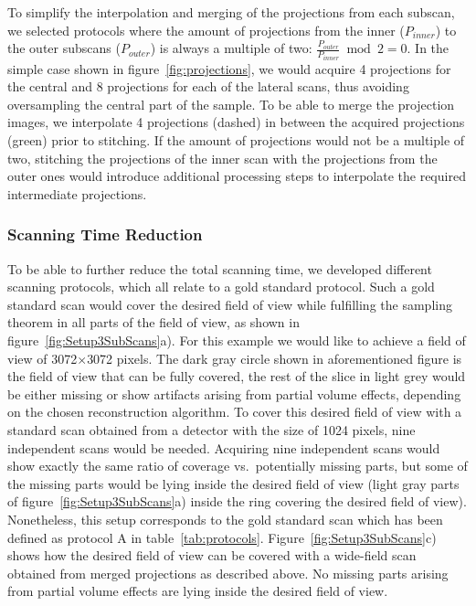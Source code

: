 To simplify the interpolation and merging of the projections from each subscan, we selected protocols where the amount of projections from the inner ($P_{inner}$) to the outer subscans ($P_{outer}$) is always a multiple of two: $\frac{P_{outer}}{P_{inner}} \bmod 2 = 0$. In the simple case shown in figure~\ref{fig:projections}, we would acquire 4 projections for the central and 8 projections for each of the lateral scans, thus avoiding oversampling the central part of the sample. To be able to merge the projection images, we interpolate 4 projections (dashed) in between the acquired projections (green) prior to stitching. If the amount of projections would not be a multiple of two, stitching the projections of the inner scan with the projections from the outer ones would introduce additional processing steps to interpolate the required intermediate projections.

\subsubsection{Scanning Time Reduction}%
To be able to further reduce the total scanning time, we developed different scanning protocols, which all relate to a gold standard protocol. Such a gold standard scan would cover the desired field of view while fulfilling the sampling theorem in all parts of the field of view, as shown in figure~\ref{fig:Setup3SubScans}a). For this example we would like to achieve a field of view of 3072$\times$3072 pixels. The dark gray circle shown in aforementioned figure is the field of view that can be fully covered, the rest of the slice in light grey would be either missing or show artifacts arising from partial volume effects, depending on the chosen reconstruction algorithm. To cover this desired field of view with a standard scan obtained from a detector with the size of 1024 pixels, nine independent scans would be needed. Acquiring nine independent scans would show exactly the same ratio of coverage vs.\ potentially missing parts, but some of the missing parts would be lying inside the desired field of view (light gray parts of figure~\ref{fig:Setup3SubScans}a) inside the ring covering the desired field of view). Nonetheless, this setup corresponds to the gold standard scan which has been defined as protocol A in table~\ref{tab:protocols}. Figure~\ref{fig:Setup3SubScans}c) shows how the desired field of view can be covered with a wide-field scan obtained from merged projections as described above. No missing parts arising from partial volume effects are lying inside the desired field of view.

